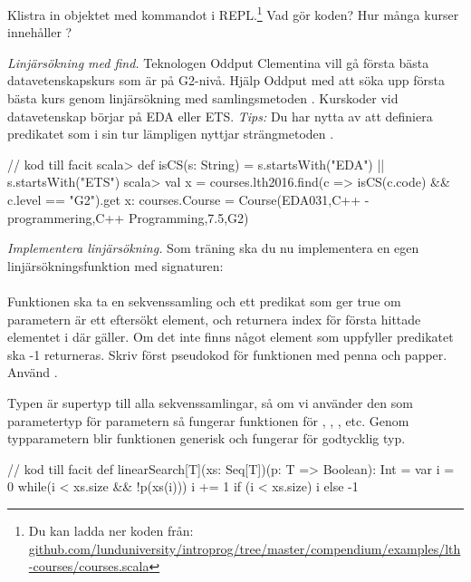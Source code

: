 \Subtask \label{subtask:download-lthcourses} Klistra in objektet  med kommandot  i REPL.\footnote{Du kan ladda ner koden från: \\ \href{https://raw.githubusercontent.com/lunduniversity/introprog/master/compendium/examples/lth-courses/courses.scala}{github.com/lunduniversity/introprog/tree/master/compendium/examples/lth-courses/courses.scala}} Vad gör koden? Hur många kurser innehåller ?


\Subtask \emph{Linjärsökning med find.} Teknologen Oddput Clementina vill gå första bästa datavetenskapskurs som är på G2-nivå. Hjälp Oddput med att söka upp första bästa kurs genom linjärsökning med samlingsmetoden . Kurskoder vid datavetenskap börjar på EDA eller ETS. \emph{Tips:} Du har nytta av att definiera predikatet  som i sin tur lämpligen nyttjar strängmetoden .

\begin{REPL}
// kod till facit
scala> def isCS(s: String) = s.startsWith("EDA") || s.startsWith("ETS")
scala> val x = courses.lth2016.find(c => isCS(c.code) && c.level == "G2").get
x: courses.Course = Course(EDA031,C++ - programmering,C++ Programming,7.5,G2)
\end{REPL}

\Subtask \emph{Implementera linjärsökning.} Som träning ska du nu implementera en egen linjärsökningsfunktion med signaturen: \\ 
\\ Funktionen ska ta en sekvenssamling  och ett predikat  som ger true om parametern är ett eftersökt element, och returnera index för första hittade elementet i  där  gäller. Om det inte finns något element som uppfyller predikatet ska -1 returneras. Skriv först pseudokod för funktionen med penna och papper. Använd . 

Typen  är supertyp till alla sekvenssamlingar, så om vi använder den som parametertyp för parametern  så fungerar funktionen för , , , etc. Genom typparametern  blir funktionen generisk och fungerar för godtycklig typ. 


\begin{Code}
// kod till facit
def linearSearch[T](xs: Seq[T])(p: T => Boolean): Int = {
  var i = 0
  while(i < xs.size && !p(xs(i))) i += 1 
  if (i < xs.size) i else -1
}
\end{Code}



